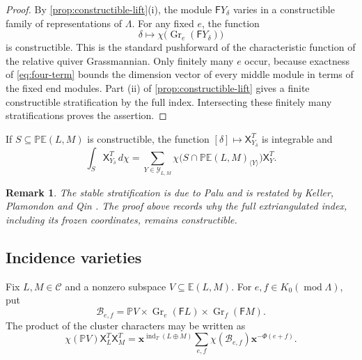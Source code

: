 \documentclass[11pt,reqno]{article}
\numberwithin{equation}{section}
\newtheorem{remark}[remark]{Remark}
\theoremstyle{definition}
\DeclareMathOperator{\Gr}{Gr}
\DeclareMathOperator{\ind}{ind}
\DeclareMathOperator{\modu}{mod}
\newcommand{\C}{\mathcal C}
\newcommand{\E}{\mathbb E}
\newcommand{\F}{\mathsf F}
\newcommand{\X}{\mathsf X}
\newcommand{\bx}{\mathbf x}
\begin{document}
\begin{proof}
By \cref{prop:constructible-lift}(i), the module $\F Y_\delta$ varies in a constructible family of representations of $\Lambda$.  For any fixed $e$, the function
\[
 \delta\longmapsto\chi\bigl(\Gr_e(\F Y_\delta)\bigr)
\]
is constructible.  This is the standard pushforward of the characteristic function of the relative quiver Grassmannian.  Only finitely many $e$ occur, because exactness of \eqref{eq:four-term} bounds the dimension vector of every middle module in terms of the fixed end modules.  Part (ii) of \cref{prop:constructible-lift} gives a finite constructible stratification by the full index.  Intersecting these finitely many stratifications proves the assertion.
\end{proof}

If $S\subseteq\mathbb P\E(L,M)$ is constructible, the function
$[\delta]\mapsto\X^T_{Y_\delta}$ is integrable and
\[
 \int_S\X^T_{Y_\delta}\,d\chi
 =\sum_{Y\in\mathcal Y_{L,M}}
   \chi\bigl(S\cap\mathbb P\E(L,M)_{\langle Y\rangle}\bigr)\X^T_Y.
\]
\begin{remark}
The stable stratification is due to Palu \cite[Proposition~2.8]{Palu2012} and is restated by Keller, Plamondon and Qin \cite[Proposition~2.7]{KellerPlamondonQin}.  The proof above records why the full extriangulated index, including its frozen coordinates, remains constructible.
\end{remark}

\subsection{Incidence varieties}\label{sec:incidence}

Fix $L,M\in\C$ and a nonzero subspace $V\subseteq\E(L,M)$.  For $e,f\in K_0(\modu\Lambda)$, put
\[
 \mathcal B_{e,f}
 =\mathbb PV\times\Gr_e(\F L)\times\Gr_f(\F M).
\]
The product of the cluster characters may be written as
\begin{equation}\label{eq:lhs-expansion}
 \chi(\mathbb PV)\X^T_L\X^T_M
 =\bx^{\ind_T(L\oplus M)}
   \sum_{e,f}\chi(\mathcal B_{e,f})\bx^{-\Phi(e+f)}.
\end{equation}
\end{document}
